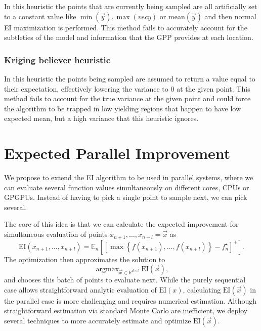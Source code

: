 \documentclass[phd,tocprelim]{cornell}
\DeclareMathOperator*{\argmax}{argmax}
\begin{document}
In this heuristic the points that are currently being sampled are all artificially set to a constant value like $\min(\vec{y}), \max(vec{y})$ or mean$(\vec{y})$ and then normal EI maximization is performed. This method fails to accurately account for the subtleties of the model and information that the GPP provides at each location.

\subsubsection{Kriging believer heuristic}

In this heuristic the points being sampled are assumed to return a value equal to their expectation, effectively lowering the variance to 0 at the given point. This method fails to account for the true variance at the given point and could force the algorithm to be trapped in low yielding regions that happen to have low expected mean, but a high variance that this heuristic ignores.

\section{Expected Parallel Improvement}

We propose to extend the EI algorithm to be used in parallel systems, where we can evaluate several function values simultaneously on different cores, CPUs or GPGPUs. Instead of having to pick a single point to sample next, we can pick several.

The core of this idea is that we can calculate the expected improvement for simultaneous evaluation of points $x_{n+1}, \ldots, x_{n+l} = \vec{x}$ as
\begin{equation}
 \mbox{EI}(x_{n+1}, \ldots, x_{n+l}) = \mathbb{E}_{n}\left[\left[\max\left\{f(x_{n+1}), \ldots, f(x_{n+l})\right\} - f_{n}^{\star}\right]^{+}\right].
\end{equation}
The optimization then approximates the solution to
\begin{equation}
 \argmax_{\vec{x} \in \mathbb{R}^{d \times l}} \mbox{EI}(\vec{x}),
\end{equation}
and chooses this batch of points to evaluate next. While the purely sequential case allows straightforward analytic evaluation of $\mbox{EI}(x)$, calculating $\mbox{EI}(\vec{x})$ in the parallel case is more challenging and requires numerical estimation. Although straightforward estimation via standard Monte Carlo are inefficient, we deploy several techniques to more accurately estimate and optimize $\mbox{EI}(\vec{x})$.
\end{document}
